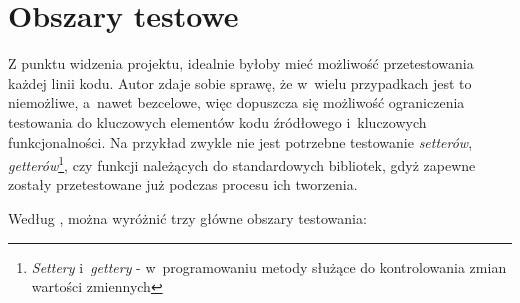 \section{Obszary testowe}
\label{obszary_testowe}
Z punktu widzenia projektu, idealnie byłoby mieć możliwość przetestowania każdej linii kodu. Autor zdaje sobie sprawę, że w~wielu przypadkach jest to niemożliwe, a~nawet bezcelowe, więc dopuszcza się możliwość ograniczenia testowania do kluczowych elementów kodu źródłowego i~kluczowych funkcjonalności. Na przykład zwykle nie jest potrzebne testowanie \textit{setterów}, \textit{getterów}\footnote{\textit{Settery} i~\textit{gettery} - w~programowaniu metody służące do kontrolowania zmian wartości zmiennych}, czy funkcji należących do standardowych bibliotek, gdyż zapewne zostały przetestowane już podczas procesu ich tworzenia. 

Według \cite{bib:android:testing:learning}, można wyróżnić trzy główne obszary testowania:


